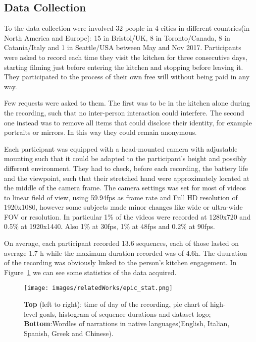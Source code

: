 

\subsection{Data Collection}
To the data collection were involved 32 people in 4 cities in different
countries(in North America and Europe): 15 in Bristol/UK, 8 in Toronto/Canada,
8 in Catania/Italy and 1 in Seattle/USA between May and Nov 2017. Participants
were asked to record each time they visit the kitchen for three consecutive days,
starting filming just before entering the kitchen and stopping before leaving it.
They participated to the process of their own free will without being paid in any way.


Few requests were asked to them. The first was to be in the kitchen alone during
the recording, such that no inter-person interaction could interfere.  The
second one instead was to remove all items that could disclose their identity, for
example portraits or mirrors. In this way they could remain anonymous.

Each participant was equipped with a head-mounted camera with adjustable mounting
such that it could be adapted to the participant's height and possibly different 
environment. They had to check, before each recording, the battery life and the viewpoint,
such that their stretched hand were approximately located at the middle of the 
camera frame.
The camera settings was set for most of videos to linear field of view, using 
59.94fps as frame rate and Full HD resolution of 1920x1080, however some 
subjects made minor changes like wide or ultra-wide FOV or resolution.
In particular 1\% of the videos were recorded at 1280x720 and 0.5\% at 1920x1440.
Also 1\% at 30fps, 1\% at 48fps and 0.2\% at 90fps.

On average, each participant recorded 13.6 sequences, each of those lasted on average 1.7 h
while the maximum duration recorded was of 4.6h. The duuration of the recording was obviously 
linked to the person's kitchen engagement. In Figure~\ref{fig:epic_stat} we can see some statistics
of the data acquired.

\begin{figure}[t]
    \centering
    \texttt{[image: images/relatedWorks/epic\_stat.png]} %
    \caption{\textbf{Top} (left to right): time of day of the recording, pie chart of high-level goals,
        histogram of sequence durations and dataset logo; \textbf{Bottom}:Wordles
        of narrations in native languages(English, Italian, Spanish, Greek and Chinese).}\label{fig:epic_stat}
\end{figure}

